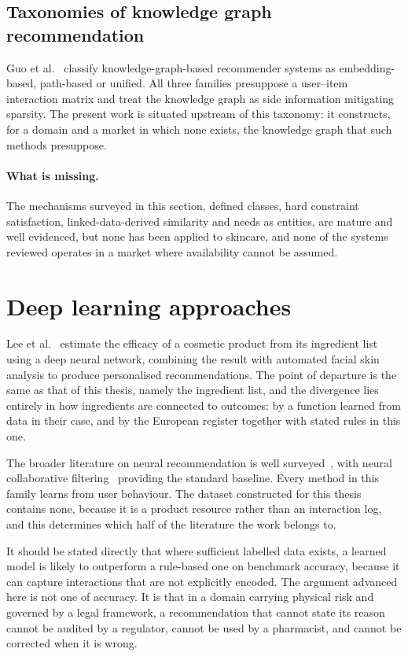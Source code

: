 \subsection{Taxonomies of knowledge graph recommendation}

Guo et al.~\cite{guo2022survey} classify knowledge-graph-based recommender
systems as embedding-based, path-based or unified. All three families presuppose
a user--item interaction matrix and treat the knowledge graph as side
information mitigating sparsity. The present work is situated upstream of this
taxonomy: it constructs, for a domain and a market in which none exists, the
knowledge graph that such methods presuppose.

\paragraph{What is missing.} The mechanisms surveyed in this section, defined
classes, hard constraint satisfaction, linked-data-derived similarity and needs
as entities, are mature and well evidenced, but none has been applied to
skincare, and none of the systems reviewed operates in a market where
availability cannot be assumed.

\section{Deep learning approaches}
\label{sec:rw-dl}

Lee et al.~\cite{lee2024} estimate the efficacy of a cosmetic product from its
ingredient list using a deep neural network, combining the result with automated
facial skin analysis to produce personalised recommendations. The point of
departure is the same as that of this thesis, namely the ingredient list, and
the divergence lies entirely in how ingredients are connected to outcomes: by a
function learned from data in their case, and by the European register together
with stated rules in this one.

The broader literature on neural recommendation is well
surveyed~\cite{zhang2019survey}, with neural collaborative
filtering~\cite{he2017ncf} providing the standard baseline. Every method in this
family learns from user behaviour. The dataset constructed for this thesis
contains none, because it is a product resource rather than an interaction log,
and this determines which half of the literature the work belongs to.

It should be stated directly that where sufficient labelled data exists, a
learned model is likely to outperform a rule-based one on benchmark accuracy,
because it can capture interactions that are not explicitly encoded. The
argument advanced here is not one of accuracy. It is that in a domain carrying
physical risk and governed by a legal framework, a recommendation that cannot
state its reason cannot be audited by a regulator, cannot be used by a
pharmacist, and cannot be corrected when it is wrong.

